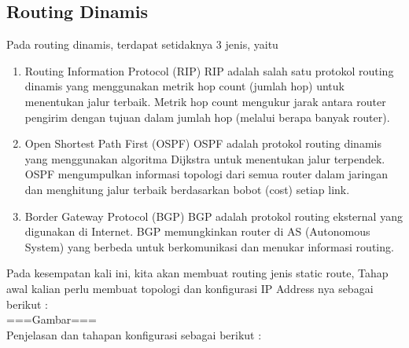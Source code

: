 \subsection{Routing Dinamis}
Pada routing dinamis, terdapat setidaknya 3 jenis, yaitu
\begin{enumerate}
	\item Routing Information Protocol (RIP) RIP adalah salah satu protokol routing dinamis yang menggunakan metrik hop count (jumlah hop) untuk menentukan jalur terbaik. Metrik hop count mengukur jarak antara router pengirim dengan tujuan dalam jumlah hop (melalui berapa banyak router).
	\item Open Shortest Path First (OSPF) OSPF adalah protokol routing dinamis yang menggunakan algoritma Dijkstra untuk menentukan jalur terpendek. OSPF mengumpulkan informasi topologi dari semua router dalam jaringan dan menghitung jalur terbaik berdasarkan bobot (cost) setiap link.
	\item Border Gateway Protocol (BGP) BGP adalah protokol routing eksternal yang digunakan di Internet. BGP memungkinkan router di AS (Autonomous System) yang berbeda untuk berkomunikasi dan menukar informasi routing.
\end{enumerate}
Pada kesempatan kali ini, kita akan membuat routing jenis static route, Tahap awal kalian perlu membuat topologi dan konfigurasi IP Address nya sebagai berikut :\\
===Gambar===\\Penjelasan dan tahapan konfigurasi sebagai berikut :

